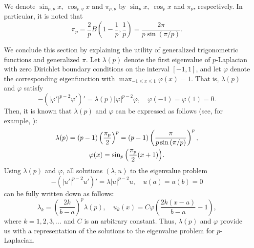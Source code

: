 \documentclass[12pt]{amsart}
\numberwithin{equation}{section}
\theoremstyle{plain}
\theoremstyle{definition}
\theoremstyle{remark}
\newcommand{\vp}{\varphi}
\begin{document}
We denote $\sin_{p,p}{x},\ \cos_{p,q}{x}$ and $\pi_{p,p}$ by
$\sin_p{x},\ \cos_p{x}$ and $\pi_p$, respectively.
In particular, it is noted that
\[\pi_p
=\frac{2}{p}B\left(1-\frac{1}{p},\frac{1}{p}\right)
=\frac{2\pi}{p\sin{(\pi/p)}}.\]

We conclude this section by explaining the utility of generalized 
trigonometric functions and generalized $\pi$.
Let $\lambda(p)$ denote the first eigenvalue of $p$-Laplacian
with zero Dirichlet boundary conditions on the interval $[-1,1]$, 
and let $\vp$ denote the corresponding 
eigenfunction with $\max_{-1 \leq x \leq 1}\vp(x)=1$.
That is, $\lambda(p)$ and $\vp$ satisfy
\[-(|\vp'|^{p-2}\vp')'=\lambda(p) |\vp|^{p-2}\vp, \quad \vp(-1)=\vp(1)=0.\]
Then, it is known that $\lambda(p)$ and $\vp$ can be expressed 
as follows (see, for example, \cites{E1981,DM1999}):
\begin{gather}
\lambda(p)=(p-1)\left(\frac{\pi_p}{2}\right)^p
=(p-1)\left(\frac{\pi}{p\sin{(\pi/p)}}\right)^p,
\label{eq:ev} \\
\vp(x)=\sin_p{\left(\frac{\pi_p}{2}(x+1)\right)}.
\notag
\end{gather}
Using $\lambda(p)$ and $\vp$, 
all solutions $(\lambda,u)$ to the eigenvalue problem
\[-(|u'|^{p-2}u')'=\lambda |u|^{p-2}u, \quad u(a)=u(b)=0\]
can be fully written down as follows:
\[\lambda_k=\left(\frac{2k}{b-a}\right)^p \lambda(p),\quad 
u_k(x)=C\vp\left(\frac{2k(x-a)}{b-a}-1\right),\]
where $k=1,2,3,\ldots$ and $C$ is an arbitrary constant.
Thus, $\lambda(p)$ and $\vp$ provide us with a representation 
of the solutions to the eigenvalue problem for $p$-Laplacian.

% 
%
%
%
\end{document}
